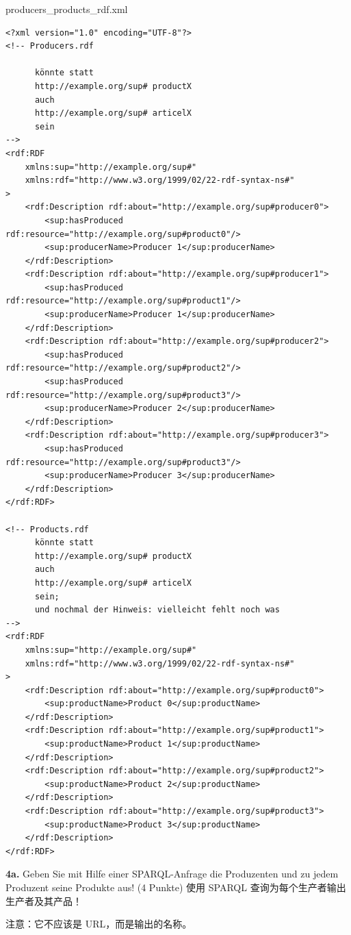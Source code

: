 \documentclass[fontset=windows]{article}
\begin{document}
producers\_products\_rdf.xml
\begin{verbatim}
<?xml version="1.0" encoding="UTF-8"?>
<!-- Producers.rdf

      könnte statt
      http://example.org/sup# productX
      auch
      http://example.org/sup# articelX
      sein
-->
<rdf:RDF
    xmlns:sup="http://example.org/sup#"
    xmlns:rdf="http://www.w3.org/1999/02/22-rdf-syntax-ns#" 
> 
  	<rdf:Description rdf:about="http://example.org/sup#producer0">
    	<sup:hasProduced rdf:resource="http://example.org/sup#product0"/>
    	<sup:producerName>Producer 1</sup:producerName>
  	</rdf:Description>
  	<rdf:Description rdf:about="http://example.org/sup#producer1">
    	<sup:hasProduced rdf:resource="http://example.org/sup#product1"/>
    	<sup:producerName>Producer 1</sup:producerName>
  	</rdf:Description>
  	<rdf:Description rdf:about="http://example.org/sup#producer2">
		<sup:hasProduced rdf:resource="http://example.org/sup#product2"/>
		<sup:hasProduced rdf:resource="http://example.org/sup#product3"/>
		<sup:producerName>Producer 2</sup:producerName>
	</rdf:Description>
	<rdf:Description rdf:about="http://example.org/sup#producer3">
		<sup:hasProduced rdf:resource="http://example.org/sup#product3"/>
		<sup:producerName>Producer 3</sup:producerName>
	</rdf:Description>
</rdf:RDF>

<!-- Products.rdf 
      könnte statt
      http://example.org/sup# productX
      auch
      http://example.org/sup# articelX
      sein;
      und nochmal der Hinweis: vielleicht fehlt noch was
-->
<rdf:RDF
    xmlns:sup="http://example.org/sup#"
    xmlns:rdf="http://www.w3.org/1999/02/22-rdf-syntax-ns#" 
> 
	<rdf:Description rdf:about="http://example.org/sup#product0">
		<sup:productName>Product 0</sup:productName>
	</rdf:Description>
	<rdf:Description rdf:about="http://example.org/sup#product1">
		<sup:productName>Product 1</sup:productName>
	</rdf:Description>
	<rdf:Description rdf:about="http://example.org/sup#product2">
		<sup:productName>Product 2</sup:productName>
	</rdf:Description>
	<rdf:Description rdf:about="http://example.org/sup#product3">
		<sup:productName>Product 3</sup:productName>
	</rdf:Description>
</rdf:RDF>
\end{verbatim}

\textbf{4a. } Geben Sie mit Hilfe einer SPARQL-Anfrage die Produzenten und zu jedem Produzent seine Produkte aus! (4 Punkte)
使用 SPARQL 查询为每个生产者输出生产者及其产品！

注意：它不应该是 URL，而是输出的名称。
\end{document}
